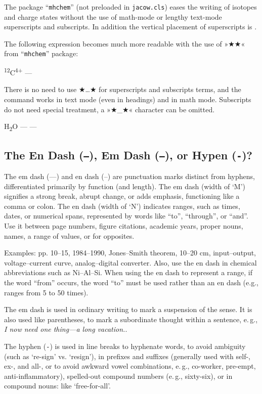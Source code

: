 \documentclass[%
               hyphens,       %
               ]{jacow}
\newcommand{\Lang}[2]{\ifboolexpr{bool{jacowLangGB}}{#1}{#2}}
\begin{document}
The package “\texttt{mhchem}” (not preloaded in \texttt{jacow.cls}) eases the writing of isotopes and charge states
without the use of math-mode or lengthy text-mode superscripts and subscripts. In addition the vertical placement 
of superscripts is \Lang{optimised}{optimized}. 

The following expression becomes much more readable with the use of »★★« from “\texttt{mhchem}” package:
\begin{TCbox}
\textsuperscript{12}C\textsuperscript{4+} --- 
\end{TCbox}
There is no need to use ★{…}★ for superscripts and subscripts terms, 
and the command works in text mode (even in headings) and in math mode.
Subscripts do not need special treatment, a »★_★« character can be omitted.
\begin{TCbox}
H\textsubscript{2}O ---  --- 
\end{TCbox}

\subsection{The En Dash (\texttt{--}), Em Dash (\texttt{---}), or Hypen (\texttt{-})?}

The em dash (—) and en dash (–) are punctuation marks distinct from hyphens, differentiated primarily by function (and length). The em dash (width of `M') signifies a strong break, abrupt change, or adds emphasis, functioning like a comma or colon. The en dash (width of `N') indicates ranges, such as times, dates, or numerical spans, represented by words like “to”, “through”, or “and”. Use it between page numbers, figure citations, academic years, proper nouns, names, a range of values, or for opposites.

Examples:
pp. 10–15, 1984–1990, Jones–Smith theorem, 10–20 cm, input–output, voltage–current curve, analog–digital converter.
Also, use the en dash in chemical abbreviations such as Ni–Al–Si. When using the en dash to represent a range, if the word “from” occurs, the word “to” must be used rather than an en dash (e.g., ranges from 5 to 50 times).

The em dash is used in ordinary writing to mark a suspension of the sense. It is also used like parentheses, to mark a subordinate thought within a sentence, e.\,g., \textit{I now need one thing---a long vacation.}.

The hyphen (\texttt{-}) is used in line breaks to hyphenate words, to avoid ambiguity (such as `re-sign'  vs. `resign'), in prefixes and suffixes (generally used with self-, ex-, and all-, or to avoid awkward vowel combinations, e.\,g., co-worker, pre-empt, anti-inflammatory), spelled-out compound numbers (e.\,g., sixty-six), or in compound nouns: like `free-for-all'.
\end{document}
